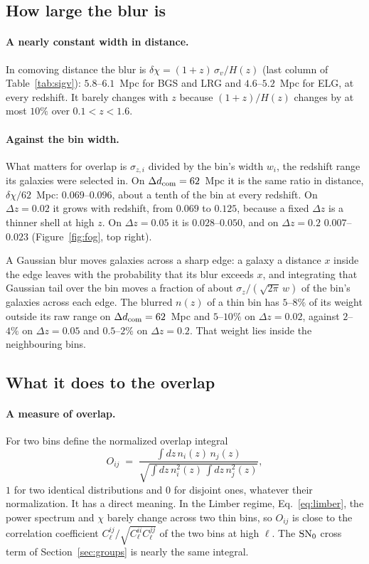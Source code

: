 \documentclass[11pt]{article}
\newcommand{\dcom}{$\Delta d_{\rm com} = 62$~Mpc}
\newcommand{\sv}{\sigma_v}
\begin{document}
\subsection{How large the blur is}

\paragraph{A nearly constant width in distance.}
In comoving distance the blur is $\delta\chi = (1 + z)\,\sv/H(z)$
(last column of Table~\ref{tab:sigv}): $5.8$--$6.1$~Mpc for BGS and
LRG and $4.6$--$5.2$~Mpc for ELG, at every redshift.  It barely changes
with $z$ because $(1 + z)/H(z)$ changes by at most $10\%$ over
$0.1 < z < 1.6$.

\paragraph{Against the bin width.}
What matters for overlap is $\sigma_{z,i}$ divided by the bin's width
$w_i$, the redshift range its galaxies were selected in.  On \dcom{} it
is the same ratio in distance, $\delta\chi/62$~Mpc: $0.069$--$0.096$,
about a tenth of the bin at every redshift.  On $\Delta z = 0.02$ it
grows with redshift, from $0.069$ to $0.125$, because a fixed
$\Delta z$ is a thinner shell at high $z$.  On $\Delta z = 0.05$ it is
$0.028$--$0.050$, and on $\Delta z = 0.2$ $0.007$--$0.023$
(Figure~\ref{fig:fog}, top right).

A Gaussian blur moves galaxies across a sharp edge: a galaxy a
distance $x$ inside the edge leaves with the probability that its
blur exceeds $x$, and integrating that Gaussian tail over the bin
moves a fraction of about
$\sigma_z/(\sqrt{2\pi}\,w)$ of the bin's galaxies across each edge.  The
blurred $n(z)$ of a thin bin has $5$--$8\%$ of its weight outside its
raw range on \dcom{} and $5$--$10\%$ on $\Delta z = 0.02$, against
$2$--$4\%$ on $\Delta z = 0.05$ and $0.5$--$2\%$ on $\Delta z = 0.2$.
That weight lies inside the neighbouring bins.

\subsection{What it does to the overlap}
\label{sec:overlap}

\paragraph{A measure of overlap.}
For two bins define the normalized overlap integral
\begin{equation}
  O_{ij} \;=\; \frac{\int dz\, n_i(z)\, n_j(z)}
  {\sqrt{\int dz\, n_i^2(z)\, \int dz\, n_j^2(z)}} ,
  \label{eq:overlap}
\end{equation}
$1$ for two identical distributions and $0$ for disjoint ones,
whatever their normalization.  It has a direct meaning.  In the Limber
regime, Eq.~\eqref{eq:limber}, the power spectrum and $\chi$ barely
change across two thin bins, so $O_{ij}$ is close to the correlation
coefficient $C^{ij}_\ell/\sqrt{C^{ii}_\ell C^{jj}_\ell}$ of the two
bins at high $\ell$.  The ${\rm SN}_0$ cross term of
Section~\ref{sec:groups} is nearly the same integral.
\end{document}
